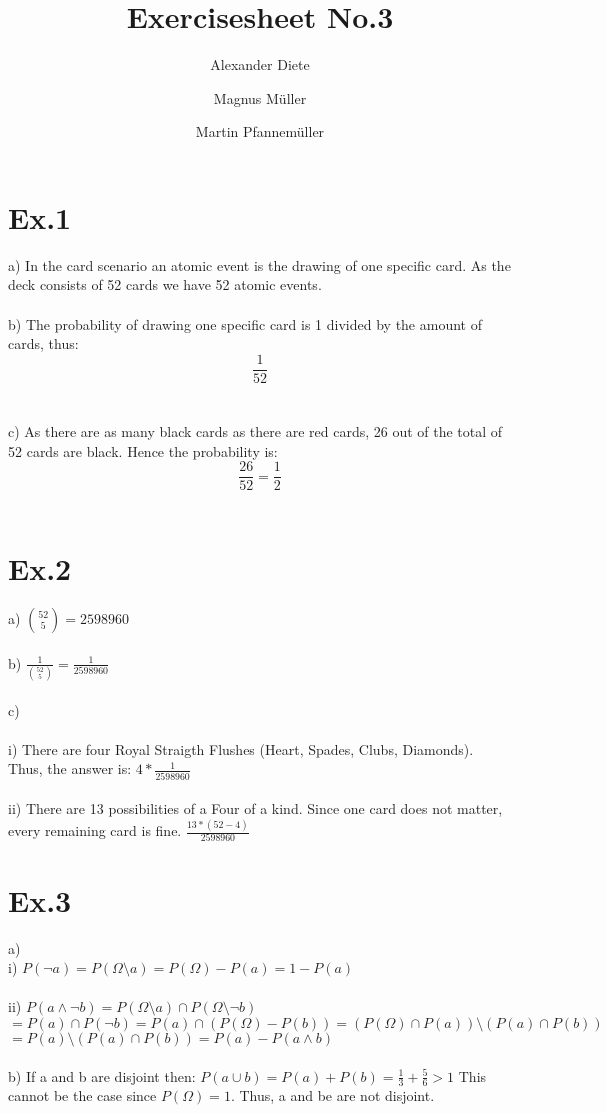 \documentclass[11pt]{article}
\title{Exercisesheet No.3}
\author{Alexander Diete \and Magnus M\"uller \and Martin Pfannem\"uller}
\begin{document}
\maketitle

\section*{Ex.1}

a)
In the card scenario an atomic event is the drawing of one specific card. As the deck consists of 52 cards we have 52 atomic events. \\
\\
b) The probability of drawing one specific card is 1 divided by the amount of cards, thus: 
$$\frac{1}{52}$$ \\
\\
c)
As there are as many black cards as there are red cards, 26 out of the total of 52 cards are black. Hence the probability is:
$$\frac{26}{52} = \frac{1}{2}$$ \\

\section*{Ex.2}

a) $\binom{52}{5} = 2598960$ \\
\\
b) $\frac{1}{\binom{52}{5}} = \frac{1}{2598960}$ \\
\\
c) \\
\\
i) There are four Royal Straigth Flushes (Heart, Spades, Clubs, Diamonds). Thus, the answer is: $4 * \frac{1}{2598960}$ \\
\\
ii) There are 13 possibilities of a Four of a kind. Since one card does not matter, every remaining card is fine. $\frac{13*(52-4)}{2598960}$

\section*{Ex.3}
a)\\
i) $P(\neg a) = P(\Omega \setminus a) = P(\Omega) - P(a) = 1 - P(a)$ \\ \\
ii) $P(a \wedge \neg b) = P(\Omega \setminus a) \cap P(\Omega \setminus \neg b)$ \\
$ = P(a) \cap P(\neg b) = P(a) \cap (P(\Omega) - P(b)) = (P(\Omega) \cap P(a)) \setminus (P(a) \cap P(b))$ \\
$= P(a) \setminus (P(a) \cap P(b)) = P(a) - P(a \wedge b)$ \\
\\
b) If a and b are disjoint then: $P(a \cup b) = P(a) + P(b) = \frac{1}{3} + \frac{5}{6} > 1$ This cannot be the case since $P(\Omega) = 1$. Thus, a and be are not disjoint. \\
\end{document}

